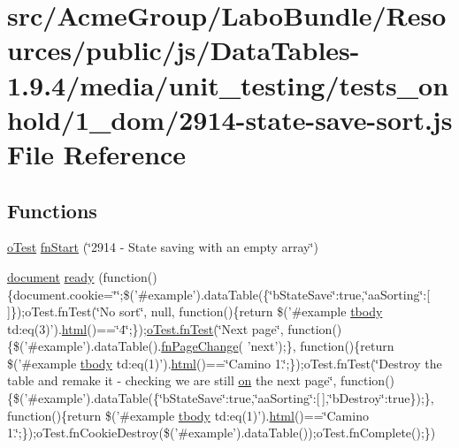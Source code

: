 \hypertarget{2914-state-save-sort_8js}{\section{src/\+Acme\+Group/\+Labo\+Bundle/\+Resources/public/js/\+Data\+Tables-\/1.9.4/media/unit\+\_\+testing/tests\+\_\+onhold/1\+\_\+dom/2914-\/state-\/save-\/sort.js File Reference}
\label{2914-state-save-sort_8js}
}
\subsection*{Functions}
\begin{DoxyCompactItemize}
\item 
\hyperlink{unit__test_8js_a3b2d259e2df3b6860d9047a92d09d0d6}{o\+Test} \hyperlink{2914-state-save-sort_8js_a0068a62e9ba5dfc9663f65166a07caca}{fn\+Start} (\char`\"{}2914 -\/ State saving with an empty array\char`\"{})
\item 
\hyperlink{outside_events_8js_aa14f8e0338cced6720590fd2ea13bd4b}{document} \hyperlink{2914-state-save-sort_8js_afd88e33776cfcc10569b43da384cc3c6}{ready} (function()\{document.\+cookie=\char`\"{}\char`\"{};\$('\#example').data\+Table(\{\char`\"{}b\+State\+Save\char`\"{}\+:true,\char`\"{}aa\+Sorting\char`\"{}\+:\mbox{[}$\,$\mbox{]}\});o\+Test.\+fn\+Test(\char`\"{}No sort\char`\"{}, null, function()\{return \$('\#example \hyperlink{core_8constructor_8js_a99b0542c7c50fe8757c55bf9dac5f3be}{tbody} td\+:eq(3)').\hyperlink{tinymce_8jquery_8dev_8js_ac2090bcf2ff968c0083d5de53a6544f3}{html}()==\char`\"{}4\char`\"{};\});\hyperlink{__zero__config__objects__subarrays_8js_a7f100cfe8617a03cd30c47b5e15396a4}{o\+Test.\+fn\+Test}(\char`\"{}Next page\char`\"{}, function()\{\$('\#example').data\+Table().\hyperlink{api_8methods_8js_a16ad2ca866b445970507d50cd508dbd2}{fn\+Page\+Change}( 'next');\}, function()\{return \$('\#example \hyperlink{core_8constructor_8js_a99b0542c7c50fe8757c55bf9dac5f3be}{tbody} td\+:eq(1)').\hyperlink{tinymce_8jquery_8dev_8js_ac2090bcf2ff968c0083d5de53a6544f3}{html}()==\char`\"{}Camino 1.\char`\"{};\});o\+Test.\+fn\+Test(\char`\"{}Destroy the table and remake it -\/ checking we are still \hyperlink{fullpage_2plugin_8min_8js_a1cfa98b7fed2aaf9fee3b68dbb7f9497}{on} the next page\char`\"{}, function()\{\$('\#example').data\+Table(\{\char`\"{}b\+State\+Save\char`\"{}\+:true,\char`\"{}aa\+Sorting\char`\"{}\+:\mbox{[}$\,$\mbox{]},\char`\"{}b\+Destroy\char`\"{}\+:true\});\}, function()\{return \$('\#example \hyperlink{core_8constructor_8js_a99b0542c7c50fe8757c55bf9dac5f3be}{tbody} td\+:eq(1)').\hyperlink{tinymce_8jquery_8dev_8js_ac2090bcf2ff968c0083d5de53a6544f3}{html}()==\char`\"{}Camino 1.\char`\"{};\});o\+Test.\+fn\+Cookie\+Destroy(\$('\#example').data\+Table());o\+Test.\+fn\+Complete();\})
\end{DoxyCompactItemize}


